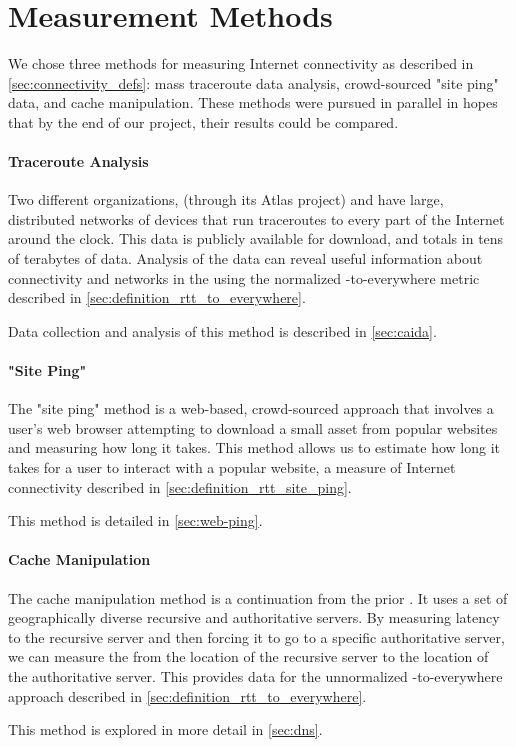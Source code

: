 \section{Measurement Methods}\label{sec:methods_overview}

We chose three methods for measuring Internet connectivity as described in \cref{sec:connectivity_defs}: mass traceroute data analysis, crowd-sourced "site ping" data, and \dns cache manipulation. These methods were pursued in parallel in hopes that by the end of our project, their results could be compared.


\paragraph{Traceroute Analysis} Two different organizations, \ripe (through its Atlas project) and \caida have large, distributed networks of devices that run traceroutes to every part of the Internet around the clock. This data is publicly available for download, and totals in tens of terabytes of data. Analysis of the data can reveal useful information about connectivity and networks in the \us using the normalized \rtt-to-everywhere metric described in \cref{sec:definition_rtt_to_everywhere}.

Data collection and analysis of this method is described in \cref{sec:caida}.

\paragraph{"Site Ping"} The "site ping" method is a web-based, crowd-sourced approach that involves a user's web browser attempting to download a small asset from popular websites and measuring how long it takes. This method allows us to estimate how long it takes for a user to interact with a popular website, a measure of Internet connectivity described in \cref{sec:definition_rtt_site_ping}.

This method is detailed in \cref{sec:web-ping}.

\paragraph{\DNS Cache Manipulation} The \dns cache manipulation method is a continuation from the prior \mqp \cite{Fakult2019}. It uses a set of geographically diverse recursive and authoritative \dns servers. By measuring latency to the recursive \dns server and then forcing it to go to a specific authoritative server, we can measure the \rtt from the location of the recursive server to the location of the authoritative server. This provides data for the unnormalized \rtt-to-everywhere approach described in \cref{sec:definition_rtt_to_everywhere}.

This method is explored in more detail in \cref{sec:dns}.
